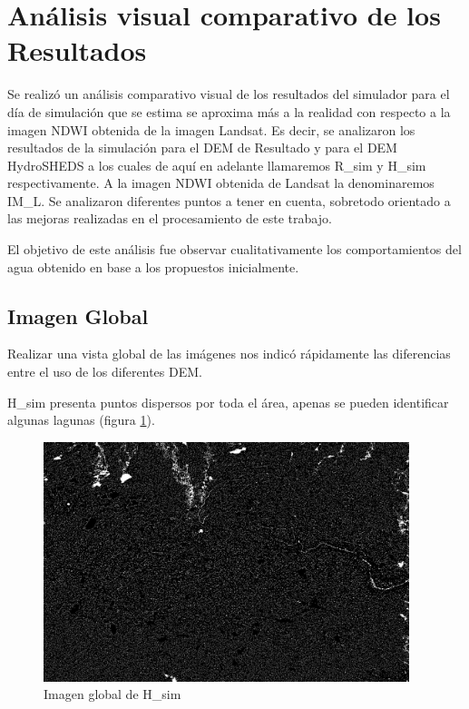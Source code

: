 \documentclass[10pt,a4paper, twoside]{report}
\begin{document}
\section{Análisis visual comparativo de los Resultados}
\label{analisisVisual}

Se realizó un análisis comparativo visual de los resultados del simulador para el día de simulación que se estima se aproxima más a la realidad con respecto a la imagen NDWI obtenida de la imagen Landsat. Es decir, se analizaron los resultados de la simulación para el DEM de Resultado y para el DEM HydroSHEDS a los cuales de aquí en adelante llamaremos R\_sim y H\_sim respectivamente. A la imagen NDWI obtenida de Landsat la denominaremos IM\_L. Se analizaron diferentes puntos a tener en cuenta, sobretodo orientado a las mejoras realizadas en el procesamiento de este trabajo.

El objetivo de este análisis fue observar cualitativamente los comportamientos del agua obtenido en base a los propuestos inicialmente.

\subsection{Imagen Global}

Realizar una vista global de las imágenes nos indicó rápidamente las diferencias entre el uso de los diferentes DEM.


H\_sim presenta puntos dispersos por toda el área, apenas se pueden identificar algunas lagunas (figura \ref{HSHEDSGlobal}).

\begin{figure}[!htb]
   \centering      
   \includegraphics[width=0.95\textwidth]{imagenes/HSHEDSGlobal.jpg}
 \caption{Imagen global de H\_sim}
 \label{HSHEDSGlobal}
\end{figure}
\end{document}
